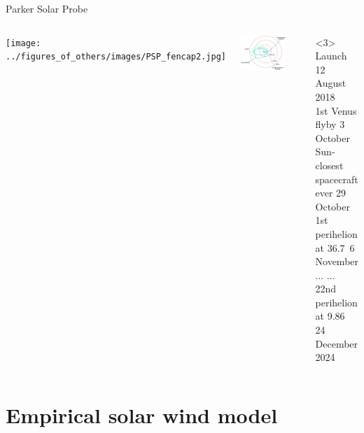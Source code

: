 \begin{frame}[plain,c]{Parker Solar Probe}{}
	\begin{columns}[c]
		
		\texttt{[image: ../figures\_of\_others/images/PSP\_fencap2.jpg]}


		\centering
		\vspace{-4mm}
		\includegraphics[width=0.75\textwidth]{../figures_of_others/images/PSP_MissionDesign2_negative_crop.png}
		\begin{block}<3>{}
			Launch	\hfill	12 August 2018\\
			1st Venus flyby	\hfill	3 October\\
			Sun-closest spacecraft ever	\hfill	29 October\\
			1st perihelion at 36.7\,\Rs{}	\hfill	6 November\\
			...	\hfill	...\\
			22nd perihelion at 9.86\,\Rs{}	\hfill	24 December 2024
		\end{block}
	\end{columns}
\end{frame}


\section{Empirical solar wind model}

